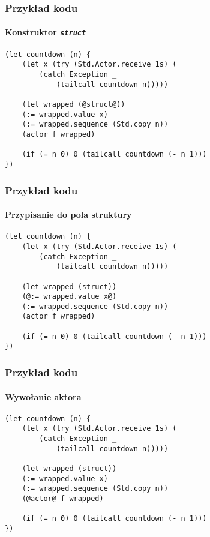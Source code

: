 \documentclass{beamer}
\begin{document}
\begin{frame}[fragile]
    \frametitle{Przykład kodu}
    \framesubtitle{Konstruktor \emph{\texttt{struct}}}

    \begin{small}
    \begin{lstlisting}
(let countdown (n) {
    (let x (try (Std.Actor.receive 1s) (
        (catch Exception _
            (tailcall countdown n)))))

    (let wrapped (@struct@))
    (:= wrapped.value x)
    (:= wrapped.sequence (Std.copy n))
    (actor f wrapped)

    (if (= n 0) 0 (tailcall countdown (- n 1)))
})
    \end{lstlisting}
    \end{small}
\end{frame}

\begin{frame}[fragile]
    \frametitle{Przykład kodu}
    \framesubtitle{Przypisanie do pola struktury}

    \begin{small}
    \begin{lstlisting}
(let countdown (n) {
    (let x (try (Std.Actor.receive 1s) (
        (catch Exception _
            (tailcall countdown n)))))

    (let wrapped (struct))
    (@:= wrapped.value x@)
    (:= wrapped.sequence (Std.copy n))
    (actor f wrapped)

    (if (= n 0) 0 (tailcall countdown (- n 1)))
})
    \end{lstlisting}
    \end{small}
\end{frame}

\begin{frame}[fragile]
    \frametitle{Przykład kodu}
    \framesubtitle{Wywołanie aktora}

    \begin{small}
    \begin{lstlisting}
(let countdown (n) {
    (let x (try (Std.Actor.receive 1s) (
        (catch Exception _
            (tailcall countdown n)))))

    (let wrapped (struct))
    (:= wrapped.value x)
    (:= wrapped.sequence (Std.copy n))
    (@actor@ f wrapped)

    (if (= n 0) 0 (tailcall countdown (- n 1)))
})
    \end{lstlisting}
    \end{small}
\end{frame}
\end{document}
